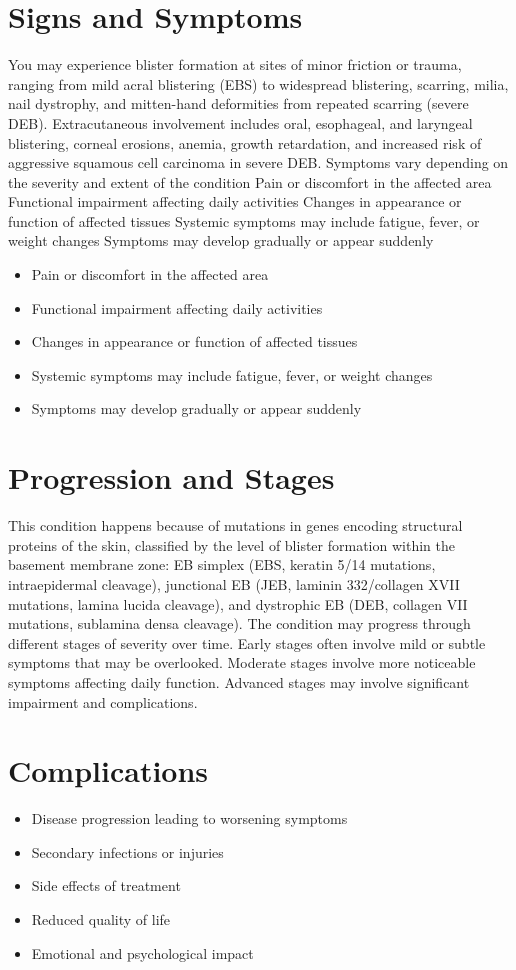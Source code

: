 \section{Signs and Symptoms}
You may experience blister formation at sites of minor friction or trauma, ranging from mild acral blistering (EBS) to widespread blistering, scarring, milia, nail dystrophy, and mitten-hand deformities from repeated scarring (severe DEB). Extracutaneous involvement includes oral, esophageal, and laryngeal blistering, corneal erosions, anemia, growth retardation, and increased risk of aggressive squamous cell carcinoma in severe DEB. Symptoms vary depending on the severity and extent of the condition Pain or discomfort in the affected area Functional impairment affecting daily activities Changes in appearance or function of affected tissues Systemic symptoms may include fatigue, fever, or weight changes Symptoms may develop gradually or appear suddenly

\begin{itemize}[noitemsep]
  \item Pain or discomfort in the affected area
  \item Functional impairment affecting daily activities
  \item Changes in appearance or function of affected tissues
  \item Systemic symptoms may include fatigue, fever, or weight changes
  \item Symptoms may develop gradually or appear suddenly
\end{itemize}
\section{Progression and Stages}
This condition happens because of mutations in genes encoding structural proteins of the skin, classified by the level of blister formation within the basement membrane zone: EB simplex (EBS, keratin 5/14 mutations, intraepidermal cleavage), junctional EB (JEB, laminin 332/collagen XVII mutations, lamina lucida cleavage), and dystrophic EB (DEB, collagen VII mutations, sublamina densa cleavage). The condition may progress through different stages of severity over time. Early stages often involve mild or subtle symptoms that may be overlooked. Moderate stages involve more noticeable symptoms affecting daily function. Advanced stages may involve significant impairment and complications.
\section{Complications}
\begin{itemize}[noitemsep]
  \item Disease progression leading to worsening symptoms
  \item Secondary infections or injuries
  \item Side effects of treatment
  \item Reduced quality of life
  \item Emotional and psychological impact
\end{itemize}
